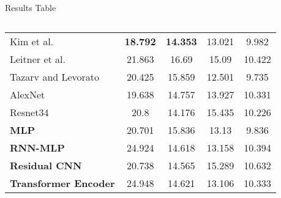 \begin{frame}{Results Table}
\begin{columns}
\begin{table}
{\begin{tabular}{lSSSS}
                    Kim et al. \cite{kim_deepcnap_2022}             & \bfseries 18.792                       & \bfseries 14.353               & 13.021           & 9.982            \\
                    Leitner et al. \cite{leitner_personalized_2022} & 21.863                                 & 16.69                          & 15.09            & 10.422           \\
                    Tazarv and Levorato \cite{tazarv_deep_2021}     & 20.425                                 & 15.859                         & 12.501           & 9.735            \\
                    AlexNet \cite{schrumpf_assessment_2021}         & 19.638                                 & 14.757                         & 13.927           & 10.331           \\
                    Resnet34 \cite{schrumpf_assessment_2021}        & 20.8                                   & 14.176                         & 15.435           & 10.226           \\
                    \textbf{MLP}                                    & 20.701                                 & 15.836                         & 13.13            & 9.836            \\
                    \textbf{RNN-MLP}                                & 24.924                                 & 14.618                         & 13.158           & 10.394           \\
                    \textbf{Residual CNN}                           & 20.738                                 & 14.565                         & 15.289           & 10.632           \\
                    \textbf{Transformer Encoder}                    & 24.948                                 & 14.621                         & 13.106           & 10.333           \\


\end{tabular}}
\end{table}
\end{columns}
\end{frame}
